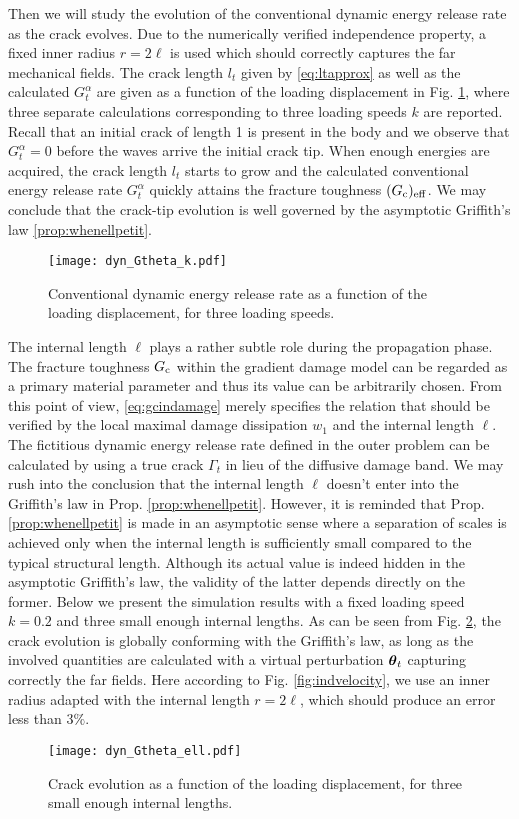 Then we will study the evolution of the conventional dynamic energy release rate as the crack evolves. Due to the numerically verified independence property, a fixed inner radius $r=2\ell$ is used which should correctly captures the far mechanical fields. The crack length $l_t$ given by \eqref{eq:ltapprox} as well as the calculated $G^\alpha_t$ are given as a function of the loading displacement in Fig. \ref{fig:evoGtGc}, where three separate calculations corresponding to three loading speeds $k$ are reported. Recall that an initial crack of length 1 is present in the body and we observe that $G^\alpha_t=0$ before the waves arrive the initial crack tip. When enough energies are acquired, the crack length $l_t$ starts to grow and the calculated conventional energy release rate $G^\alpha_t$ quickly attains the fracture toughness $(G_\mathrm{c})_\mathrm{eff}$. We may conclude that the crack-tip evolution is well governed by the asymptotic Griffith's law \ref{prop:whenellpetit}.
\begin{figure}[htbp]
\centering
\texttt{[image: dyn\_Gtheta\_k.pdf]}
\caption{Conventional dynamic energy release rate as a function of the loading displacement, for three loading speeds.} \label{fig:evoGtGc}
\end{figure}

The internal length $\ell$ plays a rather subtle role during the propagation phase. The fracture toughness $G_\mathrm{c}$ within the gradient damage model can be regarded as a primary material parameter and thus its value can be arbitrarily chosen. From this point of view, \eqref{eq:gcindamage} merely specifies the relation that should be verified by the local maximal damage dissipation $w_1$ and the internal length $\ell$. The fictitious dynamic energy release rate defined in the outer problem can be calculated by using a true crack $\Gamma_t$ in lieu of the diffusive damage band. We may rush into the conclusion that the internal length $\ell$ doesn't enter into the Griffith's law in Prop. \ref{prop:whenellpetit}. However, it is reminded that Prop. \ref{prop:whenellpetit} is made in an asymptotic sense where a separation of scales is achieved only when the internal length is sufficiently small compared to the typical structural length. Although its actual value is indeed hidden in the asymptotic Griffith's law, the validity of the latter depends directly on the former. Below we present the simulation results with a fixed loading speed $k=0.2$ and three small enough internal lengths. As can be seen from Fig. \ref{fig:evoGtGcell}, the crack evolution is globally conforming with the Griffith's law, as long as the involved quantities are calculated with a virtual perturbation $\vtheta_t$ capturing correctly the far fields. Here according to Fig. \ref{fig:indvelocity}, we use an inner radius adapted with the internal length $r=2\ell$, which should produce an error less than $3\%$.
\begin{figure}[htbp]
\centering
\texttt{[image: dyn\_Gtheta\_ell.pdf]}
\caption{Crack evolution as a function of the loading displacement, for three small enough internal lengths.} \label{fig:evoGtGcell}
\end{figure}


